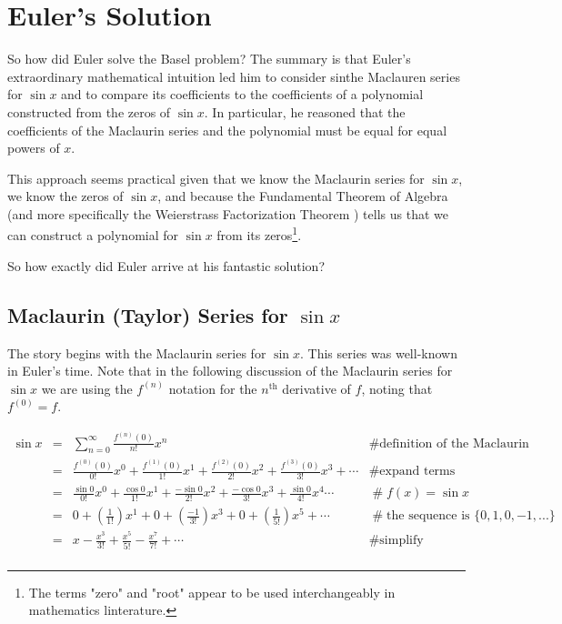 \documentclass[11pt, oneside]{article}   	%
\begin{document}
\section{Euler's Solution}
\label{sec:eulers_solution}
So how did Euler solve the Basel problem? The summary is that
Euler's extraordinary mathematical intuition led him to consider
sinthe Maclauren series \cite{wiki:taylor} for $\sin x$ and to
compare its coefficients to the coefficients of a polynomial
constructed from the zeros of $\sin x$.  In particular, he
reasoned that the coefficients of the Maclaurin series and the
polynomial must be equal for equal powers of $x$.

\bigskip
\noindent
This approach seems practical given that we know the Maclaurin
series for $\sin x$, we know the zeros of $\sin x$, and because
the Fundamental Theorem of Algebra \cite{wiki:ftoa} (and more
specifically the Weierstrass Factorization Theorem
\cite{wiki:weierstrass}) tells us that we can construct a
polynomial for $\sin x$ from its zeros\footnote{The terms "zero"
and "root" appear to be used interchangeably in mathematics
linterature.}.


\bigskip
\noindent
So how exactly did Euler arrive at his fantastic solution?

\subsection{Maclaurin (Taylor) Series for $\sin x$}
The story begins with the Maclaurin series \cite{wiki:taylor} for
$\sin x$. This series was well-known in Euler's time.  Note that
in the following discussion of the Maclaurin series for $\sin x$
we are using the $f^{(n)}$ notation for the $n^{\text{th}}$
derivative of $f$, noting that $f^{(0)} = f$.


\begin{equation*}
\begin{array}{lllll}
\sin x
&=& \sum\limits_{n=0}^{\infty} \frac{f^{(n)}(0)}{n!} x^n
        &\mathrel{\#} \text{definition of the Maclaurin series}  \\
[12pt]
&=& \frac{f^{(0)}(0)}{0!} x^0 +  \frac{f^{(1)}(0)}{1!} x^1 +
        \frac{f^{(2)}(0)}{2!} x^2 + \frac{f^{(3)}(0)}{3!} x^3 + \cdots
        &\mathrel{\#} \text{expand terms}                               \\
[12pt] 
&=& \frac{\sin 0}{0!}x^0 + \frac{\cos 0}{1!}x^1 +  \frac{-\sin
        0}{2!}x^2 +  \frac{-\cos 0}{3!}x^3 +  \frac{\sin 0}{4!} x^4 \cdots
        &\mathrel{\#} f(x) = \sin x \\ 
[12pt]
&=& 0 +  (\frac{1}{1!}) x^1 + 0 + (\frac{-1}{3!}) x^3+ 0 +
        (\frac{1}{5!}) x^5 + \cdots
        &\mathrel{\#} \text{the sequence is $\{0,1,0,-1,...\}$}   \\
[12pt]
&=&  x - \frac{x^3}{3!} + \frac{x^5}{5!}  - \frac{x^7}{7!} +
        \cdots
        &\mathrel{\#} \text{simplify} \\ 
\end{array}
\end{equation*}
\end{document}
